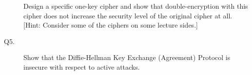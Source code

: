 \documentclass[11pt,epsfig]{article}
\begin{document}
\begin{description}
Design a specific one-key cipher and show that double-encryption with 
this cipher does not increase the security level of the original cipher at all. 
[Hint: Consider some of the ciphers on some lecture sides.] \hfill {}



\item[Q5.] 
 Show that the Diffie-Hellman Key Exchange (Agreement) Protocol is insecure with respect to active attacks.    \hfill {}






\end{description} 
\end{document}
